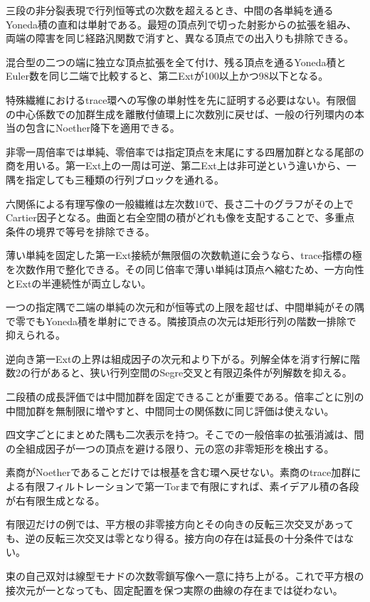 \documentclass[11pt,a4paper]{ltjsarticle}
\begin{document}
三段の非分裂表現で行列恒等式の次数を超えるとき、中間の各単純を通るYoneda積の直和は単射である。最短の頂点列で切った射影からの拡張を組み、両端の障害を同じ経路汎関数で消すと、異なる頂点での出入りも排除できる。

混合型の二つの端に独立な頂点拡張を全て付け、残る頂点を通るYoneda積とEuler数を同じ二端で比較すると、第二Extが100以上かつ98以下となる。

特殊繊維におけるtrace環への写像の単射性を先に証明する必要はない。有限個の中心係数での加群生成を離散付値環上に次数別に戻せば、一般の行列環内の本当の包含にNoether降下を適用できる。

非零一周倍率では単純、零倍率では指定頂点を末尾にする四層加群となる尾部の商を用いる。第一Ext上の一周は可逆、第二Ext上は非可逆という違いから、一隅を指定しても三種類の行列ブロックを通れる。

六関係による有理写像の一般繊維は左次数10で、長さ二十のグラフがその上でCartier因子となる。曲面と右全空間の積がどれも像を支配することで、多重点条件の境界で等号を排除できる。

薄い単純を固定した第一Ext接続が無限個の次数軌道に会うなら、trace指標の極を次数作用で整化できる。その同じ倍率で薄い単純は頂点へ縮むため、一方向性とExtの半連続性が両立しない。

一つの指定隅で二端の単純の次元和が恒等式の上限を超せば、中間単純がその隅で零でもYoneda積を単射にできる。隣接頂点の次元は矩形行列の階数一排除で抑えられる。

逆向き第一Extの上界は組成因子の次元和より下がる。列解全体を消す行解に階数2の行があると、狭い行列空間のSegre交叉と有限辺条件が列解数を抑える。

二段積の成長評価では中間加群を固定できることが重要である。倍率ごとに別の中間加群を無制限に増やすと、中間同士の関係数に同じ評価は使えない。

四文字ごとにまとめた隅も二次表示を持つ。そこでの一般倍率の拡張消滅は、間の全組成因子が一つの頂点を避ける限り、元の窓の非零矩形を検出する。

素商がNoetherであることだけでは根基を含む環へ戻せない。素商のtrace加群による有限フィルトレーションで第一Torまで有限にすれば、素イデアル積の各段が右有限生成となる。

有限辺だけの例では、平方根の非零接方向とその向きの反転三次交叉があっても、逆の反転三次交叉は零となり得る。接方向の存在は延長の十分条件ではない。

束の自己双対は線型モナドの次数零鎖写像へ一意に持ち上がる。これで平方根の接次元が一となっても、固定配置を保つ実際の曲線の存在までは従わない。
\end{document}
